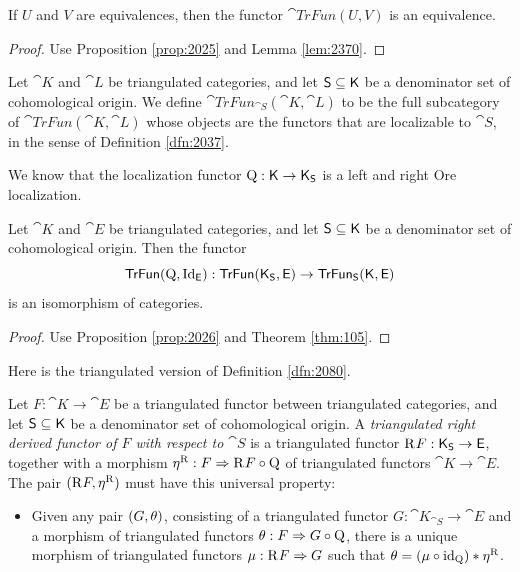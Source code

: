 \begin{lem} \label{lem:2335}
If $U$ and $V$ are equivalences, then the functor $\cat{TrFun}(U, V)$ is an 
equivalence.
\end{lem}

\begin{proof}
Use Proposition \ref{prop:2025} and  Lemma \ref{lem:2370}. 
\end{proof}

\begin{dfn} \label{dfn:2336}
Let $\cat{K}$ and $\cat{L}$ be triangulated categories,
and let $\operatorname{\mathsf{S}} \subseteq \operatorname{\mathsf{K}}$ be a denominator set of cohomological origin. 
We define 
$\cat{TrFun}_{\cat{S}}(\cat{K}, \cat{L})$
to be the full subcategory of 
$\cat{TrFun}(\cat{K}, \cat{L})$
whose objects are the functors that are localizable to $\cat{S}$, in the 
sense of Definition \ref{dfn:2037}.
\end{dfn}

We know that the localization functor 
$\operatorname{Q} : \operatorname{\mathsf{K}} \to \operatorname{\mathsf{K}}_{\operatorname{\mathsf{S}}}$ is a left and right Ore 
localization. 

\begin{lem} \label{lem:2336} 
Let $\cat{K}$ and $\cat{E}$ be triangulated categories,
and let $\operatorname{\mathsf{S}} \subseteq \operatorname{\mathsf{K}}$ be a denominator set of cohomological origin. 
Then the functor 
\[ \operatorname{\mathsf{TrFun}}(\operatorname{Q}, \operatorname{Id}_{\operatorname{\mathsf{E}}}) : 
\operatorname{\mathsf{TrFun}}(\operatorname{\mathsf{K}}_{\operatorname{\mathsf{S}}}, \operatorname{\mathsf{E}}) \to 
\operatorname{\mathsf{TrFun}}_{\operatorname{\mathsf{S}}}(\operatorname{\mathsf{K}}, \operatorname{\mathsf{E}}) \]
is an isomorphism of categories.
\end{lem}

\begin{proof}
Use Proposition \ref{prop:2026} and Theorem \ref{thm:105}. 
\end{proof}

Here is the triangulated version of Definition \ref{dfn:2080}.

\begin{dfn}  \label{dfn:131}
Let $F : \cat{K} \to \cat{E}$ be a triangulated functor between  
triangulated categories, and let 
$\operatorname{\mathsf{S}} \subseteq \operatorname{\mathsf{K}}$ be a denominator set of cohomological origin.    
A {\em triangulated right derived functor of $F$ with respect to $\cat{S}$} 
is a triangulated functor 
$\mathrm{R}^{} F : \operatorname{\mathsf{K}}_{\operatorname{\mathsf{S}}} \to \operatorname{\mathsf{E}}$,
together with a morphism 
$\eta^{\mathrm{R}} : F \Rightarrow \mathrm{R}^{} F \circ \operatorname{Q}$ 
of triangulated functors $\cat{K} \to \cat{E}$. The pair 
$(\mathrm{R} F, \eta^{\mathrm{R}})$ must have this universal property:
\begin{itemize}
\item[(R)] Given any pair $(G, \theta)$, consisting of a triangulated 
functor $G : \cat{K}_{\cat{S}} \to \cat{E}$ and a morphism of triangulated 
functors $\theta : F \Rightarrow G \circ \operatorname{Q}$, 
there is a unique morphism of triangulated functors 
$\mu : \mathrm{R}^{} F \Rightarrow G$
such that $\theta = (\mu \circ \operatorname{id}_{\operatorname{Q}}) * \eta^{\mathrm{R}}$. 
\end{itemize}
\end{dfn}

